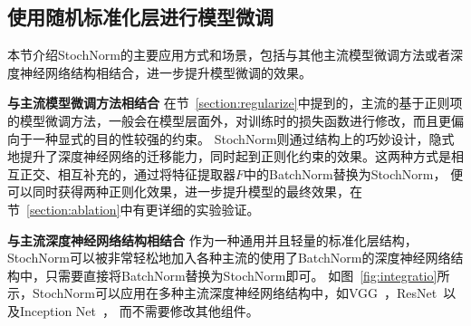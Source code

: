 


\subsection{使用随机标准化层进行模型微调}

本节介绍StochNorm的主要应用方式和场景，包括与其他主流模型微调方法或者深度神经网络结构相结合，进一步提升模型微调的效果。

\textbf{与主流模型微调方法相结合 } 在节~\ref{section:regularize}中提到的，主流的基于正则项的模型微调方法，一般会在模型层面外，对训练时的损失函数进行修改，而且更偏向于一种显式的目的性较强的约束。
StochNorm则通过结构上的巧妙设计，隐式地提升了深度神经网络的迁移能力，同时起到正则化约束的效果。这两种方式是相互正交、相互补充的，通过将特征提取器$F$中的BatchNorm替换为StochNorm，
便可以同时获得两种正则化效果，进一步提升模型的最终效果，在节~\ref{section:ablation}中有更详细的实验验证。

\textbf{与主流深度神经网络结构相结合 } 作为一种通用并且轻量的标准化层结构，StochNorm可以被非常轻松地加入各种主流的使用了BatchNorm的深度神经网络结构中，只需要直接将BatchNorm替换为StochNorm即可。
如图~\ref{fig:integratio}所示，StochNorm可以应用在多种主流深度神经网络结构中，如VGG~\citep{simonyan2015very}，ResNet~\citep{he2016deep}以及Inception Net~\citep{szegedy2016rethinking}，
而不需要修改其他组件。


